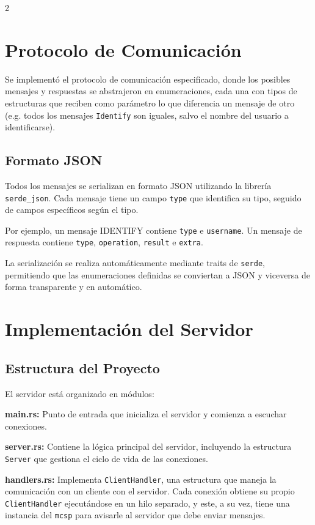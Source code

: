 \documentclass[letter,11pt]{article}
\begin{document}
\begin{multicols}{2}
\section{Protocolo de Comunicación}
Se implementó el protocolo de comunicación especificado, donde los posibles mensajes y respuestas se abstrajeron en enumeraciones, cada una con tipos de estructuras que reciben como parámetro lo que diferencia un mensaje de otro (e.g. todos los mensajes \texttt{Identify} son iguales, salvo el nombre del usuario a identificarse).

\subsection{Formato JSON}

Todos los mensajes se serializan en formato JSON utilizando la librería \texttt{serde\_json}. Cada mensaje tiene un campo \texttt{type} que identifica su tipo, seguido de campos específicos según el tipo.

Por ejemplo, un mensaje IDENTIFY contiene \texttt{type} e \texttt{username}. Un mensaje de respuesta contiene \texttt{type}, \texttt{operation}, \texttt{result} e \texttt{extra}.

La serialización se realiza automáticamente mediante traits de \texttt{serde}, permitiendo que las enumeraciones definidas se conviertan a JSON y viceversa de forma transparente y en automático.

\section{Implementación del Servidor}

\subsection{Estructura del Proyecto}

El servidor está organizado en módulos:

\textbf{main.rs:} Punto de entrada que inicializa el servidor y comienza a escuchar conexiones.

\textbf{server.rs:} Contiene la lógica principal del servidor, incluyendo la estructura \texttt{Server} que gestiona el ciclo de vida de las conexiones.

\textbf{handlers.rs:} Implementa \texttt{ClientHandler}, una estructura que maneja la comunicación con un cliente con el servidor. Cada conexión obtiene su propio \texttt{ClientHandler} ejecutándose en un hilo separado, y este, a su vez, tiene una instancia del \texttt{mcsp} para avisarle al servidor que debe enviar mensajes.


\end{multicols}
\end{document}
